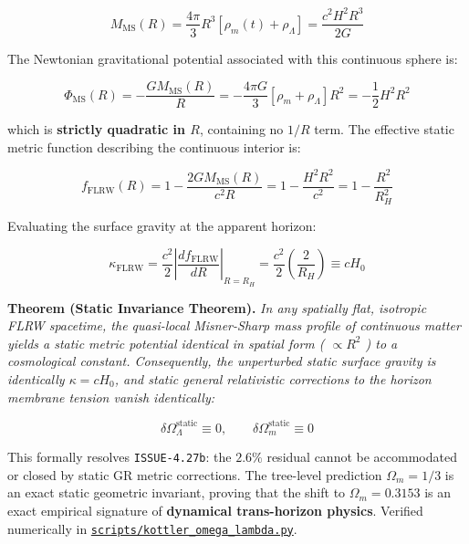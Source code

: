 \documentclass[11pt,a4paper]{article}
\theoremstyle{definition}
\theoremstyle{remark}
\begin{document}
\begin{equation}
M_{\text{MS}}(R) = \frac{4\pi}{3} R^3 [\rho_m(t) + \rho_\Lambda] = \frac{c^2 H^2 R^3}{2 G}
\end{equation}


The Newtonian gravitational potential associated with this continuous sphere is:


\begin{equation}
\Phi_{\text{MS}}(R) = -\frac{G M_{\text{MS}}(R)}{R} = -\frac{4\pi G}{3} [\rho_m + \rho_\Lambda] R^2 = -\frac{1}{2} H^2 R^2
\end{equation}


which is \textbf{strictly quadratic in $R$}, containing no $1/R$ term. The effective static metric function describing the continuous interior is:


\begin{equation}
f_{\text{FLRW}}(R) = 1 - \frac{2 G M_{\text{MS}}(R)}{c^2 R} = 1 - \frac{H^2 R^2}{c^2} = 1 - \frac{R^2}{R_H^2}
\end{equation}


Evaluating the surface gravity at the apparent horizon:


\begin{equation}
\kappa_{\text{FLRW}} = \frac{c^2}{2} \left| \frac{df_{\text{FLRW}}}{dR} \right|_{R = R_H} = \frac{c^2}{2} \left( \frac{2}{R_H} \right) \equiv c H_0
\end{equation}


\textbf{Theorem (Static Invariance Theorem).} \textit{In any spatially flat, isotropic FLRW spacetime, the quasi-local Misner-Sharp mass profile of continuous matter yields a static metric potential identical in spatial form ( $\propto R^2$ ) to a cosmological constant. Consequently, the unperturbed static surface gravity is identically $\kappa = c H_0$, and static general relativistic corrections to the horizon membrane tension vanish identically:}


\begin{equation}
\delta\Omega_\Lambda^{\text{static}} \equiv 0, \qquad \delta\Omega_m^{\text{static}} \equiv 0
\end{equation}


This formally resolves \texttt{ISSUE-4.27b}: the $2.6\%$ residual cannot be accommodated or closed by static GR metric corrections. The tree-level prediction $\Omega_m = 1/3$ is an exact static geometric invariant, proving that the shift to $\Omega_m = 0.3153$ is an exact empirical signature of \textbf{dynamical trans-horizon physics}. Verified numerically in \href{../../scripts/kottler_omega_lambda.py}{\texttt{scripts/kottler_omega_lambda.py}}.
\end{document}
